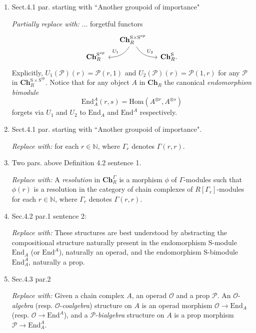 \documentclass{amsart}
\theoremstyle{definition}
\newcommand{\Hom}{\mathrm{Hom}}
\newcommand{\End}{\mathrm{End}}
\begin{document}
\begin{enumerate}
\item Sect.4.1 par. starting with ``Another groupoid of importance" \par
\textit{Partially replace with:}
... forgetful functors
\begin{equation*}
\begin{tikzcd}[column sep=small, row sep=tiny]
& \mathbf{Ch}_R^{\mathrm{S} \times \mathrm{S}^{op}} \arrow[dl, "U_1"', out=-120, in=0] \arrow[dr, "U_2", out=-60, in=180] & \\
\mathbf{Ch}_R^{\mathrm{S}^{op}} & & \mathbf{Ch}_R^{\mathrm{S}}.
\end{tikzcd}
\end{equation*}
Explicitly, $U_1(\mathcal P)(r) = \mathcal P(r,1)$ and $U_2(\mathcal P)(r) = \mathcal P(1,r)$ for any $\mathcal P$ in $\mathbf{Ch}_R^{\mathrm{S} \times \mathrm{S}^{op}}$.
Notice that for any object $A$ in $\mathbf{Ch}_R$ the canonical \textit{endomorphism bimodule}
\begin{equation*}
\End_A^A(r, s) = \Hom(A^{\otimes r}, A^{\otimes s})
\end{equation*}
forgets via $U_1$ and $U_2$ to $\End_A$ and $\End^A$ respectively.

\item Sect.4.1 par. starting with ``Another groupoid of importance". \par
\textit{Replace with:}
for each $r \in \mathbb{N}$, where $\Gamma_r$ denotes $\Gamma(r,r)$.

\item Two pars. above Definition 4.2 sentence 1. \par
\textit{Replace with:}
A \textit{resolution} in $\mathbf{Ch}_R^\Gamma$ is a morphism $\phi$ of $\Gamma$-modules such that $\phi(r)$ is a resolution in the category of chain complexes of $R[\Gamma_r]$-modules for each $r \in \mathbb{N}$, where $\Gamma_r$ denotes $\Gamma(r,r)$.

\item Sec.4.2 par.1 sentence 2: \par
\textit{Replace with:}
These structures are best understood by abstracting the compositional structure naturally present in the endomorphism $\mathrm{S}$-module $\End_A$ (or $\End^A$), naturally an operad, and the endomorphism $\mathrm{S}$-bimodule $\End_A^A$, naturally a prop.

\item Sec.4.3 par.2 \par
\textit{Replace with:}
Given a chain complex $A$, an operad $\mathcal O$ and a prop $\mathcal P$.
An $\mathcal O$-\textit{algebra} (resp. $\mathcal O$-\textit{coalgebra}) structure on $A$ is an operad morphism $\mathcal O \to \End_A$ (resp. $\mathcal O \to \End^A$), and a $\mathcal P$-\textit{bialgebra} structure on $A$ is a prop morphism $\mathcal P \to \End_A^A$.


\end{enumerate}
\end{document}

